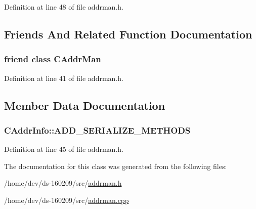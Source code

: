 Definition at line 48 of file addrman.\+h.



\subsection{Friends And Related Function Documentation}
\hypertarget{class_c_addr_info_a17ec4e9e560da58786d2ca36092bf83d}{}
\subsubsection[{C\+Addr\+Man}]{\setlength{\rightskip}{0pt plus 5cm}friend class {\bf C\+Addr\+Man}\hspace{0.3cm}{\ttfamily [friend]}}\label{class_c_addr_info_a17ec4e9e560da58786d2ca36092bf83d}


Definition at line 41 of file addrman.\+h.



\subsection{Member Data Documentation}
\hypertarget{class_c_addr_info_a9d5e0b95fa494171e4bffb900094fe2e}{}
\subsubsection[{A\+D\+D\+\_\+\+S\+E\+R\+I\+A\+L\+I\+Z\+E\+\_\+\+M\+E\+T\+H\+O\+D\+S}]{\setlength{\rightskip}{0pt plus 5cm}C\+Addr\+Info\+::\+A\+D\+D\+\_\+\+S\+E\+R\+I\+A\+L\+I\+Z\+E\+\_\+\+M\+E\+T\+H\+O\+D\+S}\label{class_c_addr_info_a9d5e0b95fa494171e4bffb900094fe2e}


Definition at line 45 of file addrman.\+h.



The documentation for this class was generated from the following files\+:\begin{DoxyCompactItemize}
\item 
/home/dev/ds-\/160209/src/\hyperlink{addrman_8h}{addrman.\+h}\item 
/home/dev/ds-\/160209/src/\hyperlink{addrman_8cpp}{addrman.\+cpp}\end{DoxyCompactItemize}
